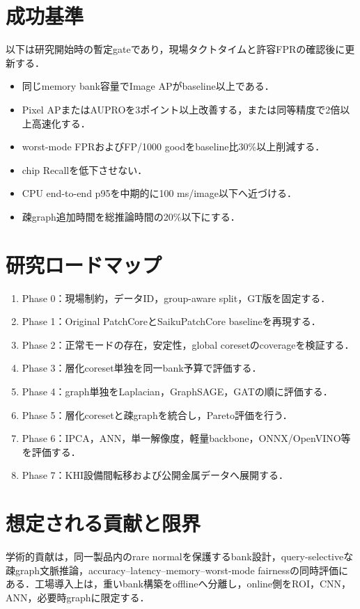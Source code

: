 \documentclass[a4paper,11pt]{ltjsarticle}
\begin{document}
\section{成功基準}
以下は研究開始時の暫定gateであり，現場タクトタイムと許容FPRの確認後に更新する．
\begin{itemize}
  \item 同じmemory bank容量でImage APがbaseline以上である．
  \item Pixel APまたはAUPROを3ポイント以上改善する，または同等精度で2倍以上高速化する．
  \item worst-mode FPRおよびFP/1000 goodをbaseline比30\%以上削減する．
  \item chip Recallを低下させない．
  \item CPU end-to-end p95を中期的に100 ms/image以下へ近づける．
  \item 疎graph追加時間を総推論時間の20\%以下にする．
\end{itemize}

\section{研究ロードマップ}
\begin{enumerate}
  \item Phase 0：現場制約，データID，group-aware split，GT版を固定する．
  \item Phase 1：Original PatchCoreとSaikuPatchCore baselineを再現する．
  \item Phase 2：正常モードの存在，安定性，global coresetのcoverageを検証する．
  \item Phase 3：層化coreset単独を同一bank予算で評価する．
  \item Phase 4：graph単独をLaplacian，GraphSAGE，GATの順に評価する．
  \item Phase 5：層化coresetと疎graphを統合し，Pareto評価を行う．
  \item Phase 6：IPCA，ANN，単一解像度，軽量backbone，ONNX/OpenVINO等を評価する．
  \item Phase 7：KHI設備間転移および公開金属データへ展開する．
\end{enumerate}

\section{想定される貢献と限界}
学術的貢献は，同一製品内のrare normalを保護するbank設計，query-selectiveな疎graph文脈推論，accuracy--latency--memory--worst-mode fairnessの同時評価にある．工場導入上は，重いbank構築をofflineへ分離し，online側をROI，CNN，ANN，必要時graphに限定する．
\end{document}
